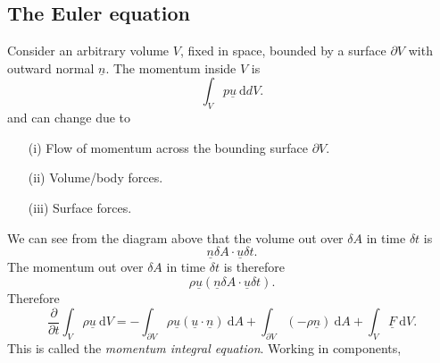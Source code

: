 \documentclass[egregdoesnotlikesansseriftitles,a4paper]{scrartcl}
\renewcommand{\vec}[1]{\underline{#1}}
\begin{document}
\subsection{The Euler equation}
Consider an arbitrary volume $V$, fixed in space, bounded by a surface $\partial V$ with outward normal $\vec{n}$. The momentum inside $V$ is \[
\int_{V}^{}p \vec{u} \ \mathrm{d}dV 
.\] and can change due to 
\begin{itemize}
    \item[(i)] Flow of momentum across the bounding surface $\partial V$. 
    \item[(ii)] Volume/body forces.
    \item[(iii)] Surface forces.
\end{itemize}
\begin{figure}[H]
    \centering
\end{figure}
We can see from the diagram above that the volume out over $\delta A$ in time $\delta t$ is \[
\vec{n}\delta  A \cdot \vec{u} \delta t
.\] The momentum out over $\delta A$ in time $\delta t$ is therefore \[
\rho \vec{u} \left(\vec{n} \delta A \cdot \vec{u} \delta t\right)
.\] Therefore \[
\frac{\partial }{\partial t}\int_{V}^{}\rho \vec{u} \ \mathrm{d}V = - \int_{\partial V}^{}\rho  \vec{u} \left(\vec{u}\cdot \vec{n}\right) \ \mathrm{d}A +\int_{\partial V}^{}\left(-\rho \vec{n}\right) \ \mathrm{d}A + \int_{V}^{}\vec{F} \ \mathrm{d}V 
.\] This is called the \emph{momentum integral equation}.
Working in components,
\end{document}
